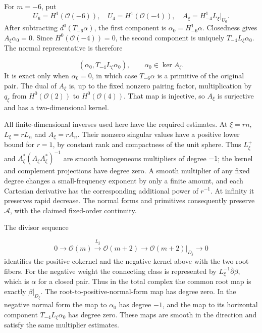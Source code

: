 \documentclass[
  english,
  11pt,
  reqno]{amsart}
\begin{document}
For \(m=-6\), put \[
U_6=H^1(\mathcal O(-6)),\quad
U_4=H^1(\mathcal O(-4)),\quad
A_\xi=H_{-4}^1L_\xi|_{U_6}.
\] After subtracting \(d^0(T_{-6}\alpha)\), the first component is
\(\alpha_0=H_{-6}^1\alpha\). Closedness gives \(A_\xi\alpha_0=0\). Since
\(H^0(\mathcal O(-4))=0\), the second component is uniquely
\(T_{-4}L_\xi\alpha_0\). The normal representative is therefore

\label{eq:online-root-negative-normal-form} \[
(\alpha_0,T_{-4}L_\xi\alpha_0),
\qquad \alpha_0\in\ker A_\xi.
\] It is exact only when \(\alpha_0=0\), in which case \(T_{-6}\alpha\)
is a primitive of the original pair. The dual of \(A_\xi\) is, up to the
fixed nonzero pairing factor, multiplication by \(q_\xi\) from
\(H^0(\mathcal O(2))\) to \(H^0(\mathcal O(4))\). That map is injective,
so \(A_\xi\) is surjective and has a two-dimensional kernel.

All finite-dimensional inverses used here have the required estimates.
At \(\xi=rn\), \(L_\xi=rL_n\) and \(A_\xi=rA_n\). Their nonzero singular
values have a positive lower bound for \(r=1\), by constant rank and
compactness of the unit sphere. Thus \(L_\xi^+\) and
\(A_\xi^*(A_\xi A_\xi^*)^{-1}\) are smooth homogeneous multipliers of
degree \(-1\); the kernel and complement projections have degree zero. A
smooth multiplier of any fixed degree changes a small-frequency exponent
by only a finite amount, and each Cartesian derivative has the
corresponding additional power of \(r^{-1}\). At infinity it preserves
rapid decrease. The normal forms and primitives consequently preserve
\(\mathscr A\), with the claimed fixed-order continuity.

The divisor sequence

\label{eq:online-root-divisor-sequence} \[
0\longrightarrow\mathcal O(m)
\xrightarrow{\,L_\xi\,}\mathcal O(m+2)
\longrightarrow\mathcal O(m+2)|_{D_\xi}\longrightarrow0
\] identifies the positive cokernel and the negative kernel above with
the two root fibers. For the negative weight the connecting class is
represented by \(L_\xi^{-1}\bar\partial\beta\), which is \(\alpha\) for
a closed pair. Thus in the total complex the common root map is exactly
\(\beta|_{D_\xi}\). The root-to-positive-normal-form map has degree
zero. In the negative normal form the map to \(\alpha_0\) has degree
\(-1\), and the map to its horizontal component \(T_{-4}L_\xi\alpha_0\)
has degree zero. These maps are smooth in the direction and satisfy the
same multiplier estimates.
\end{document}
